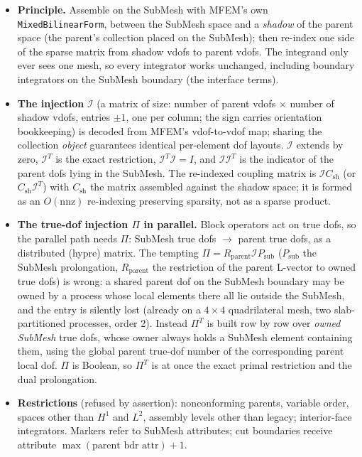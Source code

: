 \documentclass[11pt]{article}
\numberwithin{equation}{section}
\theoremstyle{remark}
\newcommand{\code}[1]{\texttt{#1}}
\begin{document}
\begin{itemize}
\item \textbf{Principle.} Assemble on the SubMesh with MFEM's own
  \code{MixedBilinearForm}, between the SubMesh space and a \emph{shadow}
  of the parent space (the parent's collection placed on the SubMesh); then
  re-index one side of the sparse matrix from shadow vdofs to parent vdofs.
  The integrand only ever sees one mesh, so every integrator works
  unchanged, including boundary integrators on the SubMesh boundary (the
  interface terms).
\item \textbf{The injection} $\mathcal{I}$ (a matrix of size: number of
  parent vdofs $\times$ number of shadow vdofs, entries $\pm1$, one per
  column; the sign carries orientation bookkeeping) is decoded from MFEM's
  vdof-to-vdof map; sharing the collection \emph{object} guarantees
  identical per-element dof layouts. $\mathcal{I}$ extends by zero,
  $\mathcal{I}^T$ is the exact restriction, $\mathcal{I}^T\mathcal{I} = I$,
  and $\mathcal{I}\mathcal{I}^T$ is the indicator of the parent dofs lying
  in the SubMesh. The re-indexed coupling matrix is $\mathcal{I}C_{\mathrm{sh}}$
  (or $C_{\mathrm{sh}}\mathcal{I}^T$) with $C_{\mathrm{sh}}$ the matrix
  assembled against the shadow space; it is formed as an $O(\mathrm{nnz})$
  re-indexing preserving sparsity, not as a sparse product.
\item \textbf{The true-dof injection $\Pi$ in parallel.} Block operators act
  on true dofs, so the parallel path needs $\Pi$: SubMesh true dofs $\to$
  parent true dofs, as a distributed (hypre) matrix. The tempting
  $\Pi = R_{\mathrm{parent}}\mathcal{I}P_{\mathrm{sub}}$ ($P_{\mathrm{sub}}$
  the SubMesh prolongation, $R_{\mathrm{parent}}$ the restriction of the
  parent L-vector to owned true dofs) is wrong: a shared parent dof on the
  SubMesh boundary may be owned by a process whose local elements there all
  lie outside the SubMesh, and the entry is silently lost (already on a
  $4\times4$ quadrilateral mesh, two slab-partitioned processes, order 2).
  Instead $\Pi^T$ is built row by row over \emph{owned SubMesh} true dofs,
  whose owner always holds a SubMesh element containing them, using the
  global parent true-dof number of the corresponding parent local dof.
  $\Pi$ is Boolean, so $\Pi^T$ is at once the exact primal restriction and
  the dual prolongation.
\item \textbf{Restrictions} (refused by assertion): nonconforming parents,
  variable order, spaces other than $H^1$ and $L^2$, assembly levels other
  than legacy; interior-face integrators. Markers refer to SubMesh
  attributes; cut boundaries receive attribute $\max(\text{parent bdr
  attr})+1$.
\end{itemize}
\end{document}
